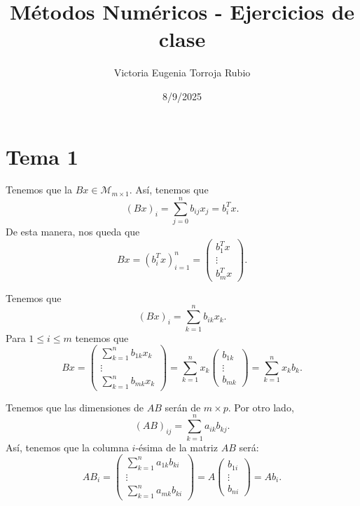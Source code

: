 \documentclass{article}
\begin{document}
\title{Métodos Numéricos - Ejercicios de clase}
\author{Victoria Eugenia Torroja Rubio}
\date{8/9/2025}

\maketitle

\section*{Tema 1}

\begin{ej}
Tenemos que la $\displaystyle Bx \in \mathcal{M}_{m \times 1} $. Así, tenemos que
\[\left(Bx\right)_{i} = \sum^{n}_{j = 0} b_{ij}x_{j} = b^{T}_{i}x .\]
De esta manera, nos queda que 
\[Bx = \left(b^{T}_{i}x\right)_{i = 1}^{n} = \begin{pmatrix} b_{1}^{T}x \\ \vdots \\ b^{T}_{m}x \end{pmatrix} .\]
\end{ej}
\begin{ej}
Tenemos que 
\[\left(Bx\right)_{i} = \sum^{n}_{k = 1}b_{ik}x_{k} .\]
Para $\displaystyle 1 \leq i \leq m $ tenemos que 
\[Bx = \begin{pmatrix} \sum^{n}_{k = 1}b_{1k}x_{k} \\ \vdots \\ \sum^{n}_{k = 1}b_{mk} x_{k}\end{pmatrix} = \sum^{n}_{k = 1}x_{k}\begin{pmatrix} b_{1k} \\ \vdots \\ b_{mk} \end{pmatrix} = \sum^{n}_{k = 1}x_{k}b_{k} .\]
\end{ej}
\begin{ej}
Tenemos que las dimensiones de $\displaystyle AB $ serán de $\displaystyle m \times p $. Por otro lado, 
\[\left(AB\right)_{ij} = \sum^{n}_{k = 1}a_{ik}b_{kj}  .\]
Así, tenemos que la columna $\displaystyle i $-ésima de la matriz $\displaystyle AB $ será:
\[ AB_{i} = \begin{pmatrix} \sum^{n}_{k= 1}a_{1k}b_{ki} \\ \vdots \\ \sum^{n}_{k = 1}a_{mk}b_{ki} \end{pmatrix} =  A \begin{pmatrix} b_{1i} \\ \vdots \\ b_{ni} \end{pmatrix} = Ab_{i}.\]
\end{ej}
\end{document}
